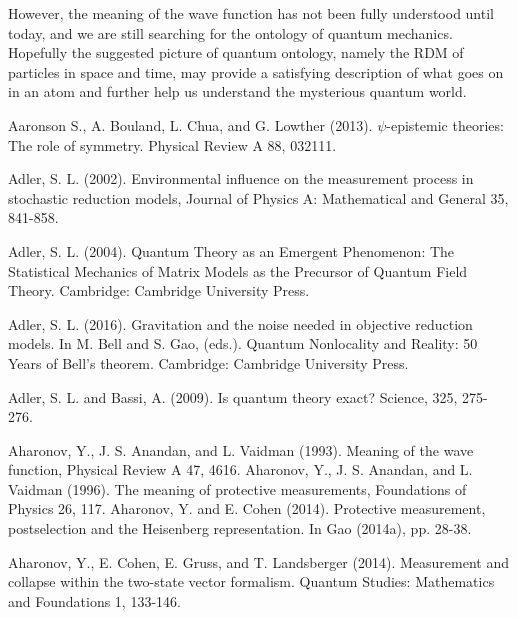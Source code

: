 \noindent However, the meaning of the wave function has not been fully understood until today, and we are still searching for the ontology of quantum mechanics.
Hopefully the suggested picture of quantum ontology, namely the RDM of particles in space and time, may provide a satisfying description of what goes on in an atom and further help us understand the mysterious quantum world.


\begin{thebibliography}{}

\bibitem{} Aaronson S., A. Bouland, L. Chua, and G. Lowther (2013). $\psi$-epistemic theories: The role of symmetry. Physical Review A 88, 032111.

\bibitem{} Adler, S. L. (2002). Environmental influence on the measurement process in stochastic reduction models, Journal of Physics A: Mathematical and General 35, 841-858.

\bibitem{} Adler, S. L. (2004). Quantum Theory as an Emergent Phenomenon: The Statistical Mechanics of Matrix Models as the Precursor of Quantum Field Theory. Cambridge: Cambridge University Press.

\bibitem{} Adler, S. L. (2016). Gravitation and the noise needed in objective reduction models. In M. Bell and S. Gao, (eds.). Quantum Nonlocality and Reality: 50 Years of Bell’s theorem. Cambridge: Cambridge University Press.

\bibitem{} Adler, S. L. and Bassi, A. (2009). Is quantum theory exact? Science, 325, 275-276.

\bibitem{} Aharonov, Y., J. S. Anandan, and L. Vaidman (1993). Meaning of the wave function, Physical Review A 47, 4616.
\bibitem{} Aharonov, Y., J. S. Anandan, and L. Vaidman (1996). The meaning of protective measurements, Foundations of Physics 26, 117.
\bibitem{} Aharonov, Y. and E. Cohen (2014). Protective measurement, postselection and the Heisenberg representation. In Gao (2014a), pp. 28-38.

\bibitem{} Aharonov, Y., E. Cohen, E. Gruss, and T. Landsberger (2014). Measurement and collapse within the two-state vector formalism. Quantum Studies: Mathematics and Foundations 1, 133-146.


\end{thebibliography}

